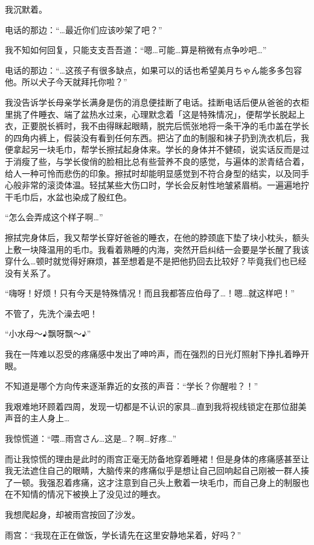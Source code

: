 我沉默着。

电话的那边：“…最近你们应该吵架了吧？”

我不知如何回复，只能支支吾吾道：“嗯…可能…算是稍微有点争吵吧…”

电话的那边：“…这孩子有很多缺点，如果可以的话也希望美月ちゃん能多多包容他。所以犬子今天就拜托你啦？”

我没告诉学长母亲学长满身是伤的消息便挂断了电话。挂断电话后便从爸爸的衣柜里挑了件睡衣、端了盆热水过来，心理默念着「这是特殊情况」，便帮学长脱起上衣，正要脱长裤时，我不由得眯起眼睛，脱完后慌张地将一条干净的毛巾盖在学长的四角内裤上，假装没有看到任何东西。把沾了血的制服和袜子扔到洗衣机后，我便拿起另一块毛巾，帮学长擦拭起身体来。学长的身体并不健硕，说实话反而是过于消瘦了些，与学长俊俏的脸相比总有些营养不良的感觉，与遍体的淤青结合着，给人一种可怜而悲伤的印象。擦拭时却能明显感觉到不符合身型的结实，以及同手心般非常的滚烫体温。轻拭某些大伤口时，学长会反射性地皱紧眉梢。一遍遍地拧干毛巾后，水盆也染成了殷红色。

“怎么会弄成这个样子啊…”

擦拭完身体后，我又帮学长穿好爸爸的睡衣，在他的脖颈底下垫了块小枕头，额头上敷一块降温用的毛巾。我看着熟睡的内海，突然开启纠结一会要是学长醒了我该穿什么…顿时就觉得好麻烦，甚至想着是不是把他扔回去比较好？毕竟我们也已经没有关系了。

“嗨呀！好烦！只有今天是特殊情况！而且我都答应伯母了…！嗯…就这样吧！”

不管了，先洗个澡去吧！

\cutlinef{\turned}

“小水母～$\eighthnote$飘呀飘～$\eighthnote$”

我在一阵难以忍受的疼痛感中发出了呻吟声，而在强烈的日光灯照射下挣扎着睁开眼。

\newday{\fullmoon\night}

不知道是哪个方向传来逐渐靠近的女孩的声音：“学长？你醒啦？！”

我艰难地环顾着四周，发现一切都是不认识的家具…直到我将视线锁定在那位甜美声音的主人身上…

我惊慌道：“喂…雨宫さん…这是…？啊…好疼…”

而让我惊慌的理由是此时的雨宫正毫无防备地穿着睡裙！但是身体的疼痛感甚至让我无法遮住自己的眼睛，大脑传来的疼痛似乎是想让自己回响起自己刚被一群人揍了一顿。我强忍着疼痛，这才注意到自己头上敷着一块毛巾，而自己身上的制服也在不知情的情况下被换上了没见过的睡衣。

我想爬起身，却被雨宫按回了沙发。

雨宫：“我现在正在做饭，学长请先在这里安静地呆着，好吗？”

